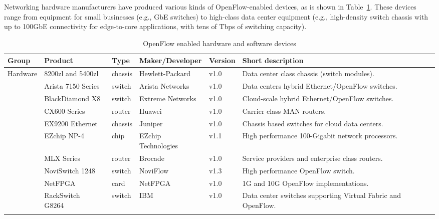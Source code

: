 Networking hardware manufacturers have produced various kinds of OpenFlow-enabled devices, as is shown in Table~\ref{tab:openflowdevices}. 
These devices range from equipment for small businesses (e.g., GbE switches) to high-class data center equipment (e.g., high-density switch chassis with up to 100GbE connectivity for edge-to-core applications, with tens of Tbps of switching capacity).

{\renewcommand{\arraystretch}{1.4}
\begin{table}[!htp]
\caption{OpenFlow enabled hardware and software devices}
\label{tab:openflowdevices}
\begin{center}
\footnotesize
\begin{tabularx}{\linewidth}{p{1.1cm}p{3.1cm}p{0.9cm}p{2.4cm}p{0.95cm}X}
\hline
\textbf{Group} & \textbf{Product} & \textbf{Type} & \textbf{Maker/Developer} & \textbf{Version} & \textbf{Short description} \\
\hline
\multirow{16}{*}{Hardware} 
& 8200zl and 5400zl~\cite{hp2013} & chassis & Hewlett-Packard & v1.0 & Data center class chassis (switch modules). \\\cline{2-6}
& Arista 7150 Series~\cite{aristanetworks2013} & switch & Arista Networks & v1.0 & Data centers hybrid Ethernet/OpenFlow switches. \\\cline{2-6}
& BlackDiamond X8~\cite{extremenetworks2013} & switch & Extreme Networks & v1.0 & Cloud-scale  hybrid Ethernet/OpenFlow switches. \\\cline{2-6}
& CX600 Series~\cite{co.2013} & router & Huawei & v1.0 & Carrier class MAN routers. \\\cline{2-6}
& EX9200 Ethernet~\cite{junipernetworks2013} & chassis & Juniper & v1.0 & Chassis based switches for cloud data centers. \\\cline{2-6}
& EZchip NP-4~\cite{yokneam2011} & chip & EZchip Technologies & v1.1 & High performance 100-Gigabit network processors. \\\cline{2-6}
& MLX Series~\cite{brocade2013} & router & Brocade & v1.0 & Service providers and enterprise class routers. \\\cline{2-6}
& NoviSwitch 1248~\cite{noviflow2013-1} & switch & NoviFlow & v1.3& High performance OpenFlow switch. \\\cline{2-6}
& NetFPGA~\cite{netfpga2014} & card & NetFPGA & v1.0 & 1G and 10G OpenFlow implementations. \\\cline{2-6}
& RackSwitch G8264~\cite{ibm2013} & switch & IBM & v1.0 & Data center switches supporting Virtual Fabric and OpenFlow. \\\cline{2-6}

\end{tabularx}
\end{center}
\end{table}}
